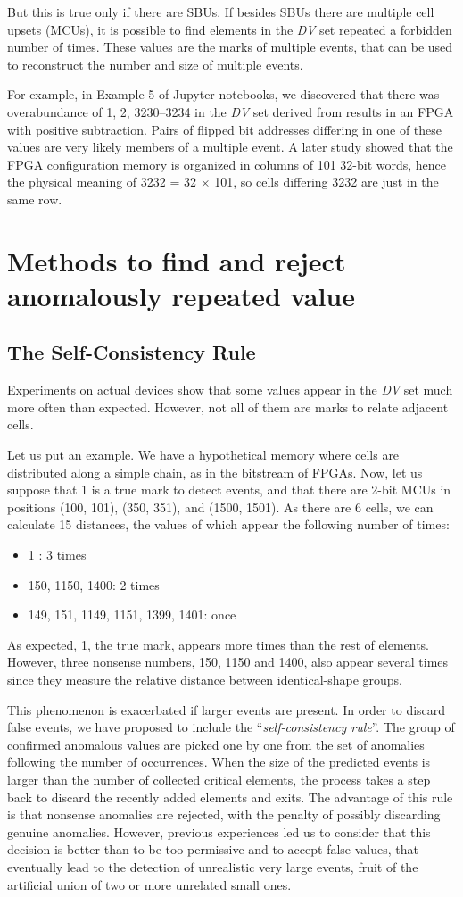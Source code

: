 But this is true only if there are SBUs. If besides SBUs there are multiple cell upsets (MCUs), it is possible to find elements in the \textit{DV} set repeated a forbidden number of times. These values are the marks of multiple events, that can be used to reconstruct the number and size of multiple events.

For example, in Example 5 of Jupyter notebooks, we discovered that there was overabundance of 1, 2, 3230--3234 in the \textit{DV} set derived from results in an FPGA with positive subtraction. Pairs of flipped bit addresses differing in one of these values are very likely members of a multiple event. A later study showed that the FPGA configuration memory is organized in columns of 101 32-bit words, hence the physical meaning of 3232 = 32 $\times$ 101, so cells differing 3232 are just in the same row.
%
\section{Methods to find and reject anomalously repeated value}
%
\subsection{The Self-Consistency Rule}\label{Subsec:SelfConsistencyRule}
Experiments on actual devices show that some values appear in the \textit{DV} set much more often than expected. However, not all of them are marks to relate adjacent cells. 

Let us put an example. We have a hypothetical memory where cells are distributed along a simple chain, as in the bitstream of FPGAs. Now, let us suppose that 1 is a true mark to detect events, and that there are 2-bit MCUs in positions (100, 101), (350, 351), and (1500, 1501). As there are 6 cells, we can calculate 15 distances, the values of which appear the following number of times:
%
\begin{itemize}
	\item 1 : 3 times
	\item 150, 1150, 1400: 2 times
	\item 149, 151, 1149, 1151, 1399, 1401: once
\end{itemize}
%
As expected, 1, the true mark, appears more times than the rest of elements. However, three nonsense numbers, 150, 1150 and 1400, also appear  several times since they measure the relative distance between identical-shape groups.

This phenomenon is exacerbated if larger events are present. In order to discard false events, we have proposed to include the ``\textit{self-consistency rule}''. The group of confirmed anomalous values are picked one by one from the set of anomalies following the number of occurrences. When the size of the predicted events is larger than the number of collected critical elements, the process takes a step back to discard the recently added elements and exits. The advantage of this rule is that nonsense anomalies are rejected, with the penalty of possibly discarding genuine anomalies. However, previous experiences led us to consider that this decision is better than to be too permissive and to accept false values, that eventually lead to the detection of unrealistic very large events, fruit of the artificial union of two or more unrelated small ones.
%
